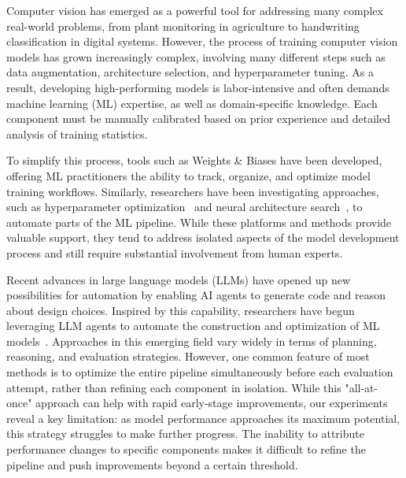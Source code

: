 \label{sec:intro}
Computer vision has emerged as a powerful tool for addressing many complex real-world problems, from plant monitoring in agriculture to handwriting classification in digital systems. However, the process of training computer vision models has grown increasingly complex, involving many different steps such as data augmentation, architecture selection, and hyperparameter tuning. As a result, developing high-performing models is labor-intensive and often demands machine learning (ML) expertise, as well as domain-specific knowledge. Each component must be manually calibrated based on prior experience and detailed analysis of training statistics.

To simplify this process, tools such as Weights \& Biases have been developed, offering ML practitioners the ability to track, organize, and optimize model training workflows. Similarly, researchers have been investigating approaches, such as hyperparameter optimization~\citep{bergstra2012hpo,bergstra2011hpo,snoek2012hpo,springenberg2016hpo,falkner2018hpo} and neural architecture search~\citep{elsken2017nas,kandasamy2018bo}, to automate parts of the ML pipeline. While these platforms and methods provide valuable support, they tend to address isolated aspects of the model development process and still require substantial involvement from human experts.

Recent advances in large language models (LLMs) have opened up new possibilities for automation by enabling AI agents to generate code and reason about design choices. Inspired by this capability, researchers have begun leveraging LLM agents to automate the construction and optimization of ML models~\citep{grosnit2024kaggleagent, trirat2024automlagent, hong2024datainterpreter, li2024autokaggle, guo2024dsagent}. Approaches in this emerging field vary widely in terms of planning, reasoning, and evaluation strategies. However, one common feature of most methods is to optimize the entire pipeline simultaneously before each evaluation attempt, rather than refining each component in isolation. While this "all-at-once" approach can help with rapid early-stage improvements, our experiments reveal a key limitation: as model performance approaches its maximum potential, this strategy struggles to make further progress. The inability to attribute performance changes to specific components makes it difficult to refine the pipeline and push improvements beyond a certain threshold.

